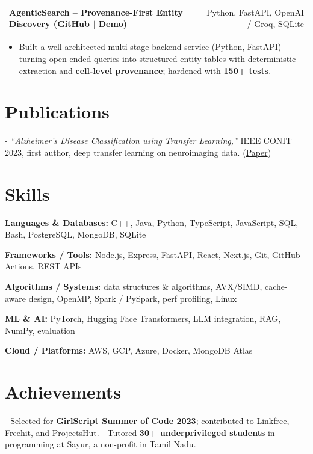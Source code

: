 \documentclass[letterpaper,11pt]{article}
\makeatletter
\newcommand{\projItem}[2]{%
  \vspace{6pt}
  \begin{tabular*}{\textwidth}{@{}l@{\extracolsep{\fill}}r@{}}
    \textbf{#1} & #2 \\
  \end{tabular*}\par\vspace{-2pt}
}
\newcommand{\skillLine}[2]{\textbf{#1:} #2\par\vspace{2pt}}
\newcommand{\inlineBlock}[1]{{\setlength{\leftskip}{0.18in}\small #1\par}}
\makeatother
\begin{document}
\projItem{AgenticSearch -- Provenance-First Entity Discovery {\normalfont\small(\href{https://github.com/Deva-1903/ciir_agentic_search}{GitHub} $\vert$ \href{https://agentic-search-negglszkwa-uc.a.run.app}{Demo})}}{Python, FastAPI, OpenAI / Groq, SQLite}
\begin{itemize}
  \item Built a well-architected multi-stage backend service (Python, FastAPI) turning open-ended queries into structured entity tables with deterministic extraction and \textbf{cell-level provenance}; hardened with \textbf{150+ tests}.
\end{itemize}

\section{Publications}
\inlineBlock{- \textit{``Alzheimer's Disease Classification using Transfer Learning,''} IEEE CONIT 2023, first author, deep transfer learning on neuroimaging data. {\normalfont\small(\href{https://ieeexplore.ieee.org/document/10205760}{Paper})}}

\section{Skills}
\skillLine{Languages \& Databases}{C++, Java, Python, TypeScript, JavaScript, SQL, Bash, PostgreSQL, MongoDB, SQLite}
\skillLine{Frameworks / Tools}{Node.js, Express, FastAPI, React, Next.js, Git, GitHub Actions, REST APIs}
\skillLine{Algorithms / Systems}{data structures \& algorithms, AVX/SIMD, cache-aware design, OpenMP, Spark / PySpark, perf profiling, Linux}
\skillLine{ML \& AI}{PyTorch, Hugging Face Transformers, LLM integration, RAG, NumPy, evaluation}
\skillLine{Cloud / Platforms}{AWS, GCP, Azure, Docker, MongoDB Atlas}

\section{Achievements}
\inlineBlock{- Selected for \textbf{GirlScript Summer of Code 2023}; contributed to Linkfree, Freehit, and ProjectsHut. - Tutored \textbf{30+ underprivileged students} in programming at Sayur, a non-profit in Tamil Nadu.}
\end{document}
